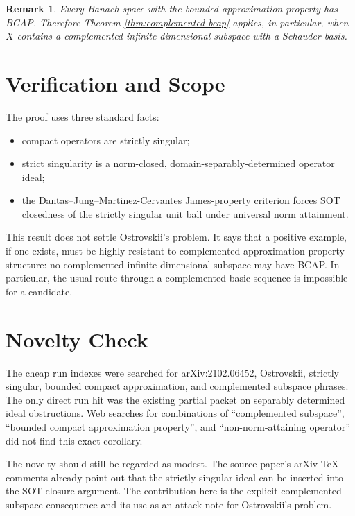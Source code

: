 \documentclass[11pt]{amsart}
\newtheorem{remark}{Remark}
\begin{document}
\begin{remark}
Every Banach space with the bounded approximation property has BCAP.  Therefore
Theorem \ref{thm:complemented-bcap} applies, in particular, when \(X\) contains
a complemented infinite-dimensional subspace with a Schauder basis.
\end{remark}

\section{Verification and Scope}

The proof uses three standard facts:

\begin{itemize}
\item compact operators are strictly singular;
\item strict singularity is a norm-closed, domain-separably-determined operator
ideal;
\item the Dantas--Jung--Martinez-Cervantes James-property criterion forces SOT
closedness of the strictly singular unit ball under universal norm attainment.
\end{itemize}

This result does not settle Ostrovskii's problem.  It says that a positive
example, if one exists, must be highly resistant to complemented
approximation-property structure: no complemented infinite-dimensional subspace
may have BCAP.  In particular, the usual route through a complemented basic
sequence is impossible for a candidate.

\section{Novelty Check}

The cheap run indexes were searched for arXiv:2102.06452, Ostrovskii,
strictly singular, bounded compact approximation, and complemented subspace
phrases.  The only direct run hit was the existing partial packet on separably
determined ideal obstructions.  Web searches for combinations of
``complemented subspace'', ``bounded compact approximation property'', and
``non-norm-attaining operator'' did not find this exact corollary.

The novelty should still be regarded as modest.  The source paper's arXiv TeX
comments already point out that the strictly singular ideal can be inserted
into the SOT-closure argument.  The contribution here is the explicit
complemented-subspace consequence and its use as an attack note for
Ostrovskii's problem.
\end{document}

